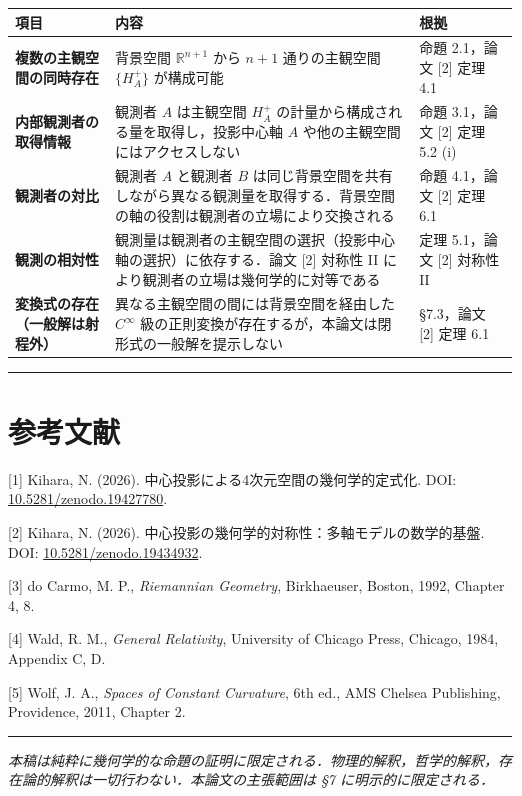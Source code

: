 \documentclass[a4paper,11pt]{ltjsarticle}
\theoremstyle{definition}
\begin{document}
\begin{longtable}{p{4cm}p{7.5cm}p{3.5cm}}
\toprule
項目 & 内容 & 根拠 \\
\midrule
\endhead
\textbf{複数の主観空間の同時存在} & 背景空間 \(\mathbb{R}^{n+1}\) から \(n+1\) 通りの主観空間 \(\{H_A^+\}\) が構成可能 & 命題 2.1，論文 {[2]} 定理 4.1 \\
\addlinespace
\textbf{内部観測者の取得情報} & 観測者 \(A\) は主観空間 \(H_A^+\) の計量から構成される量を取得し，投影中心軸 \(A\) や他の主観空間にはアクセスしない & 命題 3.1，論文 {[2]} 定理 5.2 (i) \\
\addlinespace
\textbf{観測者の対比} & 観測者 \(A\) と観測者 \(B\) は同じ背景空間を共有しながら異なる観測量を取得する．背景空間の軸の役割は観測者の立場により交換される & 命題 4.1，論文 {[2]} 定理 6.1 \\
\addlinespace
\textbf{観測の相対性} & 観測量は観測者の主観空間の選択（投影中心軸の選択）に依存する．論文 {[2]} 対称性 II により観測者の立場は幾何学的に対等である & 定理 5.1，論文 {[2]} 対称性 II \\
\addlinespace
\textbf{変換式の存在（一般解は射程外）} & 異なる主観空間の間には背景空間を経由した \(C^\infty\) 級の正則変換が存在するが，本論文は閉形式の一般解を提示しない & \S7.3，論文 {[2]} 定理 6.1 \\
\bottomrule
\end{longtable}

\bigskip\hrule\bigskip

\section*{参考文献}

\noindent
{[1]} Kihara, N. (2026). 中心投影による4次元空間の幾何学的定式化. DOI: \href{https://doi.org/10.5281/zenodo.19427780}{10.5281/zenodo.19427780}.

\noindent
{[2]} Kihara, N. (2026). 中心投影の幾何学的対称性：多軸モデルの数学的基盤. DOI: \href{https://doi.org/10.5281/zenodo.19434932}{10.5281/zenodo.19434932}.

\noindent
{[3]} do Carmo, M. P., \textit{Riemannian Geometry}, Birkhaeuser, Boston, 1992, Chapter 4, 8.

\noindent
{[4]} Wald, R. M., \textit{General Relativity}, University of Chicago Press, Chicago, 1984, Appendix C, D.

\noindent
{[5]} Wolf, J. A., \textit{Spaces of Constant Curvature}, 6th ed., AMS Chelsea Publishing, Providence, 2011, Chapter 2.

\bigskip\hrule\bigskip

\begin{center}
\textit{本稿は純粋に幾何学的な命題の証明に限定される．物理的解釈，哲学的解釈，存在論的解釈は一切行わない．本論文の主張範囲は \S7 に明示的に限定される．}
\end{center}
\end{document}
